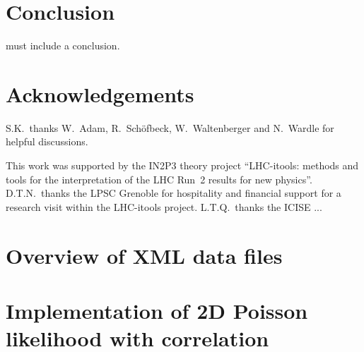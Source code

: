 \documentclass[submission, Phys]{SciPost}
\begin{document}
\section{Conclusion}
 must include a conclusion.

\section*{Acknowledgements}

S.K.~thanks W.~Adam, R.~Sch\"ofbeck, W.~Waltenberger and N.~Wardle for helpful discussions. 


This work was supported by the IN2P3 theory project 
``LHC-itools: methods and tools for the interpretation of the LHC Run~2 results for new physics''. 
D.T.N.\ thanks the LPSC Grenoble for hospitality and financial support for a research visit within the LHC-itools project. 
L.T.Q.\ thanks the ICISE ...


\begin{appendix}

\section{Overview of XML data files}

\section{Implementation of 2D Poisson likelihood with correlation}


\end{appendix}
\end{document}
